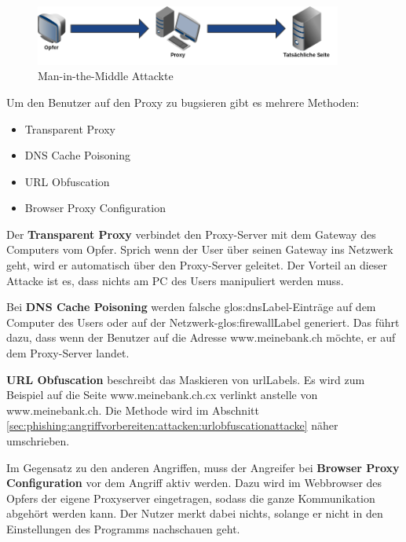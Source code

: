 \begin{figure}[H]
  \centering
  \includegraphics[width=0.9\textwidth]{images/man-in-the-middle-attacke.png}
  \caption{Man-in-the-Middle Attackte}
  \label{fig:phishing:angriffvorbereiten:attacken:maninthemiddleattacke}
\end{figure}

Um den Benutzer auf den Proxy zu bugsieren gibt es mehrere Methoden:
\begin{itemize}
\item Transparent Proxy
\item DNS Cache Poisoning
\item URL Obfuscation
\item Browser Proxy Configuration
\end{itemize}

Der \textbf{Transparent Proxy} verbindet den Proxy-Server mit dem Gateway des Computers vom Opfer. Sprich wenn der User über seinen Gateway ins Netzwerk geht, wird er automatisch über den Proxy-Server geleitet. Der Vorteil an dieser Attacke ist es, dass nichts am PC des Users manipuliert werden muss.

Bei \textbf{DNS Cache Poisoning} werden falsche \gls{glos:dnsLabel}-Einträge auf dem Computer des Users oder auf der Netzwerk-\gls{glos:firewallLabel} generiert. Das führt dazu, dass wenn der Benutzer auf die Adresse www.meinebank.ch möchte, er auf dem Proxy-Server landet.

\textbf{URL Obfuscation} beschreibt das Maskieren von \Glspl{urlLabel}. Es wird zum Beispiel auf die Seite www.meinebank.ch.cx verlinkt anstelle von www.meinebank.ch. Die Methode wird im Abschnitt \ref{sec:phishing:angriffvorbereiten:attacken:urlobfuscationattacke} näher umschrieben.

Im Gegensatz zu den anderen Angriffen, muss der Angreifer bei \textbf{Browser Proxy Configuration} vor dem Angriff aktiv werden. Dazu wird im Webbrowser des Opfers der eigene Proxyserver eingetragen, sodass die ganze Kommunikation abgehört werden kann. Der Nutzer merkt dabei nichts, solange er nicht in den Einstellungen des Programms nachschauen geht.

